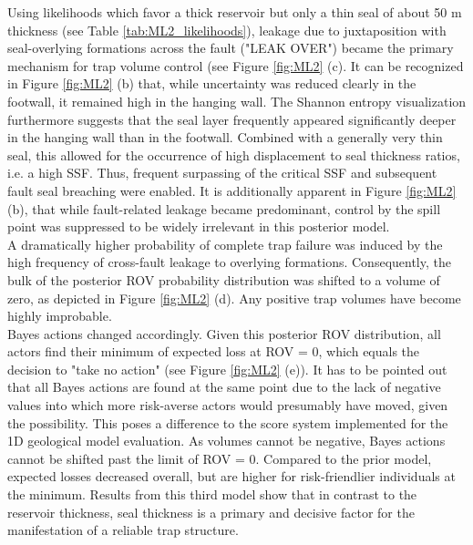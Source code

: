 		Using likelihoods which favor a thick reservoir but only a thin seal of about 50 m thickness (see Table \ref{tab:ML2_likelihoods}), leakage due to juxtaposition with seal-overlying formations across the fault ("LEAK OVER") became the primary mechanism for trap volume control (see Figure \ref{fig:ML2} (c). It can be recognized in Figure \ref{fig:ML2} (b) that, while uncertainty was reduced clearly in the footwall, it remained high in the hanging wall. The Shannon entropy visualization furthermore suggests that the seal layer frequently appeared significantly deeper in the hanging wall than in the footwall. Combined with a generally very thin seal, this allowed for the occurrence of high displacement to seal thickness ratios, i.e. a high SSF. Thus, frequent surpassing of the critical SSF and subsequent fault seal breaching were enabled. It is additionally apparent in Figure \ref{fig:ML2} (b), that while fault-related leakage became predominant, control by the spill point was suppressed to be widely irrelevant in this posterior model.\\	%
		A dramatically higher probability of complete trap failure was induced by the high frequency of cross-fault leakage to overlying formations. Consequently, the bulk of the posterior ROV probability distribution was shifted to a volume of zero, as depicted in Figure \ref{fig:ML2} (d). Any positive trap volumes have become highly improbable.\\
		Bayes actions changed accordingly. Given this posterior ROV distribution, all actors find their minimum of expected loss at ROV = 0, which equals the decision to "take no action" (see Figure \ref{fig:ML2} (e)). It has to be pointed out that all Bayes actions are found at the same point due to the lack of negative values into which more risk-averse actors would presumably have moved, given the possibility. This poses a difference to the score system implemented for the 1D geological model evaluation. As volumes cannot be negative, Bayes actions cannot be shifted past the limit of ROV = 0. Compared to the prior model, expected losses decreased overall, but are higher for risk-friendlier individuals at the minimum. Results from this third model show that in contrast to the reservoir thickness, seal thickness is a primary and decisive factor for the manifestation of a reliable trap structure.
		

